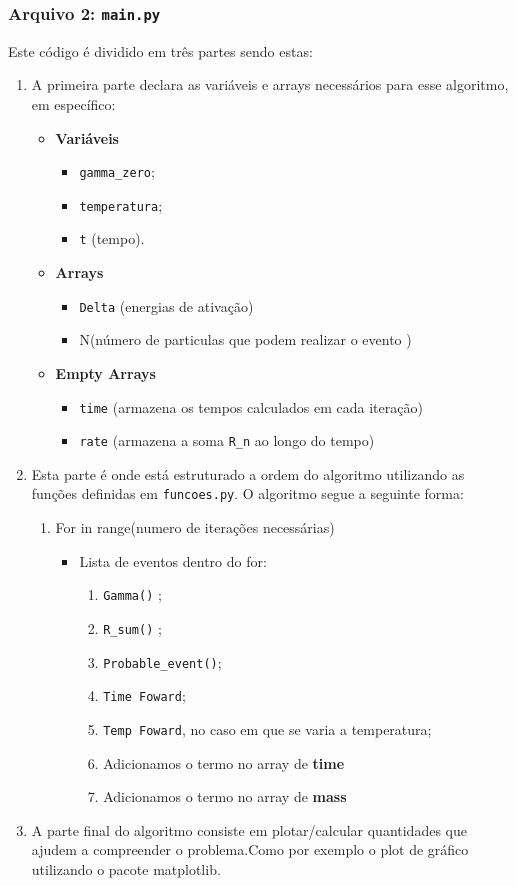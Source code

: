 \documentclass[11pt]{article}
\begin{document}
\subsubsection{Arquivo 2: \texttt{main.py}}
\label{sec:orgc805b5f}
Este código é dividido em três partes sendo estas:
\begin{enumerate}
\item A primeira parte declara as variáveis e arrays necessários para esse algoritmo, em específico:

\begin{itemize}
\item \textbf{Variáveis}
\begin{itemize}
\item \texttt{gamma\_zero};
\item \texttt{temperatura};
\item \texttt{t} (tempo).
\end{itemize}
\item \textbf{Arrays}
\begin{itemize}
\item \texttt{Delta} (energias de ativação)
\item N(número de particulas que podem realizar o evento )
\end{itemize}
\item \textbf{Empty Arrays}
\begin{itemize}
\item \texttt{time} (armazena os tempos calculados em cada iteração)
\item \texttt{rate} (armazena a soma \texttt{R\_n} ao longo do tempo)
\end{itemize}
\end{itemize}
\item Esta parte é onde está estruturado a ordem do algoritmo utilizando as funções definidas em \texttt{funcoes.py}. O algoritmo segue a seguinte forma:
\begin{enumerate}
\item For in range(numero de iterações necessárias)
\begin{itemize}
\item Lista de eventos dentro do for:
\begin{enumerate}
\item \texttt{Gamma()} ;
\item \texttt{R\_sum()} ;
\item \texttt{Probable\_event()};
\item \texttt{Time Foward};
\item \texttt{Temp Foward}, no caso em que se varia a temperatura;
\item Adicionamos o termo no array de \textbf{time}
\item Adicionamos o termo no array de \textbf{mass}
\end{enumerate}
\end{itemize}
\end{enumerate}
\item A parte final do algoritmo consiste em plotar/calcular quantidades que ajudem a compreender o problema.Como por exemplo o plot de gráfico utilizando o pacote matplotlib.
\end{enumerate}
\end{document}
